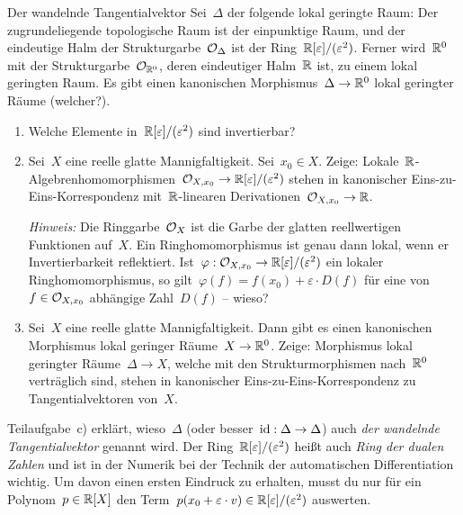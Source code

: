 \documentclass{uebblatt}
\newcommand{\dualnumbers}{\ensuremath{\RR[\varepsilon]/(\varepsilon^2)}}
\begin{document}

\begin{aufgabe}{Der wandelnde Tangentialvektor}
Sei~$\Delta$ der folgende lokal geringte Raum: Der zugrundeliegende
topologische Raum ist der einpunktige Raum, und der eindeutige Halm der
Strukturgarbe~$\mathcal{O}_\Delta$ ist der Ring~\dualnumbers.
Ferner wird~$\mathbb{R}^0$ mit der Strukturgarbe~$\mathcal{O}_{\mathbb{R}^0}$, deren eindeutiger
Halm~$\mathbb{R}$ ist, zu einem lokal geringten Raum. Es gibt einen kanonischen
Morphismus~$\Delta \to \mathbb{R}^0$ lokal geringter Räume (welcher?).

\begin{enumerate}
\item Welche Elemente in~\dualnumbers{} sind invertierbar?
\item Sei~$X$ eine reelle glatte Mannigfaltigkeit. Sei~$x_0 \in X$. Zeige:
Lokale~$\mathbb{R}$-Al\-geb\-ren\-ho\-mo\-mor\-phis\-men~$\O_{X,x_0} \to \dualnumbers$ stehen in
kanonischer Eins-zu-Eins-Korrespondenz mit~$\mathbb{R}$-linearen Derivationen~$\mathcal{O}_{X,x_0} \to \mathbb{R}$.

\emph{Hinweis:} Die Ringgarbe~$\mathcal{O}_X$ ist die Garbe der glatten reellwertigen
Funktionen auf~$X$. Ein Ringhomomorphismus ist genau dann lokal, wenn er
Invertierbarkeit reflektiert. Ist~$\varphi : \O_{X,x_0} \to \dualnumbers$ ein
lokaler Ringhomomorphismus, so gilt~$\varphi(f) = f(x_0) + \varepsilon \cdot
D(f)$ für eine von~$f \in \mathcal{O}_{X,x_0}$ abhängige Zahl~$D(f)$ -- wieso?
\item Sei~$X$ eine reelle glatte Mannigfaltigkeit. Dann gibt es einen
kanonischen Morphismus lokal geringer Räume~$X \to \mathbb{R}^0$. Zeige: Morphismus
lokal geringter Räume~$\Delta \to X$, welche mit den Strukturmorphismen
nach~$\mathbb{R}^0$ verträglich sind, stehen in kanonischer Eins-zu-Eins-Korrespondenz
zu Tangentialvektoren von~$X$.
\end{enumerate}

Teilaufgabe~c) erklärt, wieso~$\Delta$ (oder besser~$\mathrm{id} : \Delta \to \Delta$)
auch \emph{der wandelnde Tangentialvektor} genannt wird. Der
Ring~$\dualnumbers$ heißt auch \emph{Ring der dualen Zahlen} und ist in der
Numerik bei der Technik der automatischen Differentiation wichtig. Um davon
einen ersten Eindruck zu erhalten, musst du nur für ein Polynom~$p \in \mathbb{R}[X]$
den Term~$p(x_0 + \varepsilon \cdot v) \in \dualnumbers$ auswerten.
\end{aufgabe}
\end{document}
